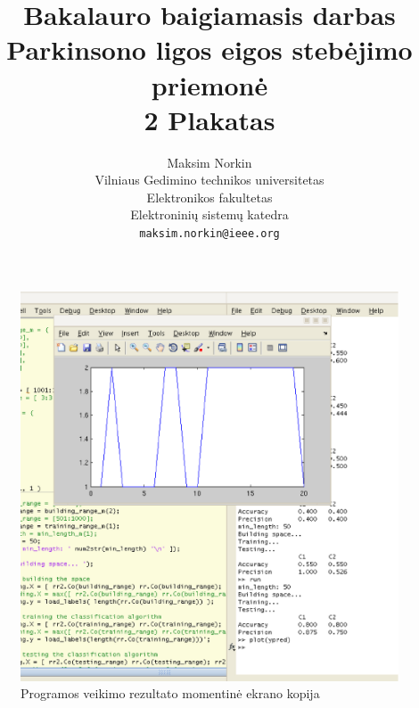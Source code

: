 \documentclass[a4paper,11pt,onecolumn]{IEEEtran}
\author{Maksim Norkin\\Vilniaus Gedimino technikos universitetas\\Elektronikos fakultetas\\Elektroninių sistemų katedra\\\texttt{maksim.norkin@ieee.org}}
\title{Bakalauro baigiamasis darbas\\Parkinsono ligos eigos stebėjimo priemonė\\2 Plakatas}
\begin{document}
	\maketitle
	
	\begin{figure}[!b]
	\centering
	\includegraphics[width=430px]{screen}
	\caption{Programos veikimo rezultato momentinė ekrano kopija}
	\end{figure}
\end{document}
